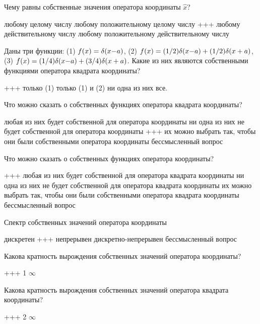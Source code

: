 \documentclass[11pt,a4paper]{exam}
\newcommand{\rightchoice}{\choice +++ }
\begin{document}
\begin{questions}
\question Чему равны собственные значения оператора координаты $\hat x$?
\begin{choices}
\choice любому целому числу         
\choice любому положительному целому числу
\rightchoice любому действительному числу      
\choice любому положительному действительному числу
\end{choices}

\question Даны три функции: 
(1) $f(x) = \delta (x{\rm{ - }}a)$, (2) $f(x) = (1/2)\delta (x{\rm{ - }}a) + (1/2)\delta (x + a)$, (3) $f(x) = (1/4)\delta (x{\rm{ - }}a) + (3/4)\delta (x + a)$. 
Какие из них являются собственными функциями оператора квадрата координаты?
\begin{choices}
\rightchoice только (1)      
\choice только (1) и (2)      
\choice ни одна из них     
\choice все.
\end{choices}

\question Что можно сказать о собственных функциях оператора квадрата координаты? 
\begin{choices}
\choice любая из них будет собственной для оператора координаты
\choice ни одна из них не будет собственной для оператора координаты
\rightchoice их можно выбрать так, чтобы они были собственными оператора координаты
\choice бессмысленный вопрос
\end{choices}

\question Что можно сказать о собственных функциях оператора координаты? 
\begin{choices}
\rightchoice любая из них будет собственной для оператора квадрата координаты
\choice ни одна из них не будет собственной для оператора квадрата координаты
\choice их можно выбрать так, чтобы они были собственными оператора квадрата координаты
\choice бессмысленный вопрос
\end{choices}

\question Спектр собственных значений оператора координаты 
\begin{choices}
\choice дискретен          
\rightchoice непрерывен
\choice дискретно-непрерывен     
\choice бессмысленный вопрос
\end{choices}

\question Какова кратность вырождения собственных значений оператора координаты?
\begin{choices}
\rightchoice 1      
\choice $\infty $
\end{choices}

\question Какова кратность вырождения собственных значений оператора квадрата координаты?
\begin{choices}
\rightchoice 2      
\choice $\infty $
\end{choices}


\end{questions}
\end{document}
